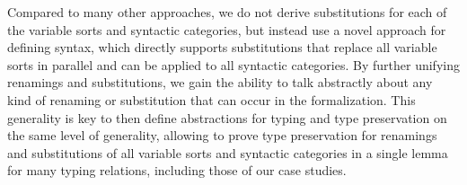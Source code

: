 \documentclass[sigplan,10pt, anonymous]{acmart}
\begin{document}
  Compared to many other approaches, we do not derive substitutions
  for each of the variable sorts and syntactic categories, but instead
  use a novel approach for defining syntax, which directly supports
  substitutions that replace all variable sorts in parallel and can be
  applied to all syntactic categories.
  By further unifying renamings and substitutions, we gain the ability
  to talk abstractly about any kind of renaming or substitution that
  can occur in the formalization.
  This generality is key to then define abstractions for typing and
  type preservation on the same level of generality, allowing to prove
  type preservation for renamings and substitutions of all variable
  sorts and syntactic categories in a single lemma for many typing
  relations, including those of our case studies.




  
  


\end{document}
